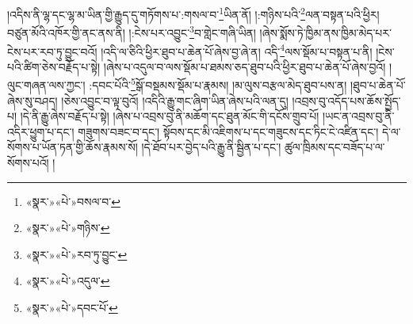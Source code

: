 །འདིས་ནི་ལྷ་དང་ལྷ་མ་ཡིན་གྱི་རྒྱུད་དུ་གཏོགས་པ་:གསལ་བ་\footnote{«སྣར་»«པེ་»བསལ་བ་}ཡིན་ནོ། །:གཉིས་པའི་\footnote{«སྣར་»«པེ་»གཉིས་}ལན་བསྟན་པའི་ཕྱིར། བཙུན་མོའི་འཁོར་གྱི་ནང་ནས་ནི། །:ངེས་པར་འབྱུང་\footnote{«སྣར་»«པེ་»རབ་ཏུ་བྱུང་}བ་གླེང་གཞི་ཡིན། །ཞེས་སྨོས་ཏེ་ཁྱིམ་ནས་ཁྱིམ་མེད་པར་ངེས་པར་རབ་ཏུ་བྱུང་བའོ། །འདི་ལ་ཅིའི་ཕྱིར་ཐུབ་པ་ཆེན་པོ་ཞེས་བྱ་ཞེ་ན། འདི་\footnote{«སྣར་»«པེ་»འདུལ་}ལས་སྡོམ་པ་བསྟན་པ་ནི། །ངེས་པའི་ཚིག་ཅེས་བརྗོད་པ་སྟེ། །ཞེས་པ་འདུལ་བ་ལས་སྡོམ་པ་ཐམས་ཅད་ཐུབ་པའི་ཕྱིར་ཐུབ་པ་ཆེན་པོ་ཞེས་བྱའོ། །ལུང་གཞན་ལས་ཀྱང་། :དབང་པོའི་\footnote{«སྣར་»«པེ་»དབང་པོ་}སྒོ་བསྡམས་སྡོམ་པ་རྣམས། །མ་ལུས་བརྩལ་མེད་ཐུབ་པས་ན། །ཐུབ་པ་ཆེན་པོ་ཞེས་སུ་བཤད། །ཅེས་འབྱུང་བ་ལྟ་བུའོ། །འདིའི་རྒྱུ་གང་ཞིག་ཡིན་ཞེས་པའི་ལན་དུ། །འབྲས་བུ་འདོད་པས་ཆོས་སྤྱོད་པ། །དེ་ནི་རྒྱུ་ཞེས་བརྗོད་པ་སྟེ། །ཞེས་པ་འབྲས་བུ་ནི་མཆོག་དང་ཐུན་མོང་གི་དངོས་གྲུབ་པོ། །ཡང་ན་འབྲས་བུ་ནི་འདིར་ཕྱུག་པ་དང་། གཟུགས་བཟང་བ་དང་། སྟོབས་དང་མི་འཇིགས་པ་དང་གཟུངས་དང་ཏིང་ངེ་འཛིན་དང་། དེ་ལ་སོགས་པ་ཡོན་ཏན་གྱི་ཆོས་རྣམས་སོ། །དེ་ཐོབ་པར་བྱེད་པའི་རྒྱུ་ནི་སྦྱིན་པ་དང་། ཚུལ་ཁྲིམས་དང་བཟོད་པ་ལ་སོགས་པའོ། །

